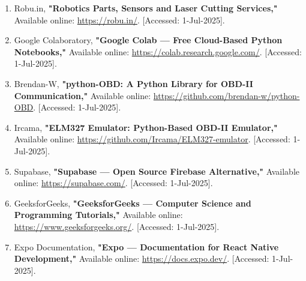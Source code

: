 \begin{enumerate}
    \item Robu.in, \textbf{"Robotics Parts, Sensors and Laser Cutting Services,"} Available online: \url{https://robu.in/}. [Accessed: 1-Jul-2025].

    \item Google Colaboratory, \textbf{"Google Colab — Free Cloud-Based Python Notebooks,"} Available online: \url{https://colab.research.google.com/}. [Accessed: 1-Jul-2025].

    \item Brendan-W, \textbf{"python-OBD: A Python Library for OBD-II Communication,"} Available online: \url{https://github.com/brendan-w/python-OBD}. [Accessed: 1-Jul-2025].

    \item Ircama, \textbf{"ELM327 Emulator: Python-Based OBD-II Emulator,"} Available online: \url{https://github.com/Ircama/ELM327-emulator}. [Accessed: 1-Jul-2025].

    \item Supabase, \textbf{"Supabase — Open Source Firebase Alternative,"} Available online: \url{https://supabase.com/}. [Accessed: 1-Jul-2025].

    \item GeeksforGeeks, \textbf{"GeeksforGeeks — Computer Science and Programming Tutorials,"} Available online: \url{https://www.geeksforgeeks.org/}. [Accessed: 1-Jul-2025].

    \item Expo Documentation, \textbf{"Expo — Documentation for React Native Development,"} Available online: \url{https://docs.expo.dev/}. [Accessed: 1-Jul-2025].

\end{enumerate}
